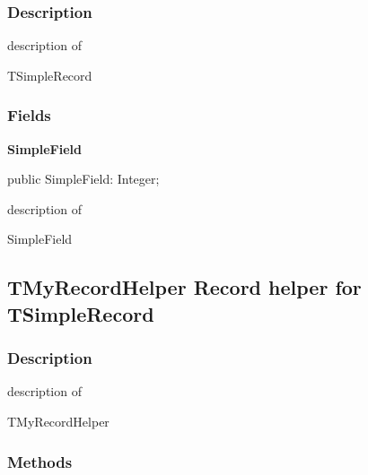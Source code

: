 \documentclass{report}
\newif\ifpdf
\begin{document}
\subsubsection*{\large{\textbf{Description}}\normalsize\hspace{1ex}\hfill}
description of \begin{ttfamily}TSimpleRecord\end{ttfamily}\subsubsection*{\large{\textbf{Fields}}\normalsize\hspace{1ex}\hfill}
\begin{list}{}{
\setlength{\itemindent}{0cm}
\setlength{\listparindent}{0cm}
\setlength{\leftmargin}{\evensidemargin}
\addtolength{\leftmargin}{\tmplength}
\settowidth{\labelsep}{X}
\addtolength{\leftmargin}{\labelsep}
\setlength{\labelwidth}{\tmplength}
}
\label{ok_class_record_helpers.TSimpleRecord-SimpleField}
\item[\textbf{SimpleField}\hfill]
\ifpdf
\begin{flushleft}
\fi
\begin{ttfamily}
public SimpleField: Integer;\end{ttfamily}

\ifpdf
\end{flushleft}
\fi


\par description of \begin{ttfamily}SimpleField\end{ttfamily}\end{list}
\ifpdf
\subsection*{\large{\textbf{TMyRecordHelper Record helper for TSimpleRecord}}\normalsize\hspace{1ex}\hrulefill}
\else
\subsection*{TMyRecordHelper Record helper for TSimpleRecord}
\fi
\label{ok_class_record_helpers.TMyRecordHelper}
\subsubsection*{\large{\textbf{Description}}\normalsize\hspace{1ex}\hfill}
description of \begin{ttfamily}TMyRecordHelper\end{ttfamily}\subsubsection*{\large{\textbf{Methods}}\normalsize\hspace{1ex}\hfill}
\end{document}
